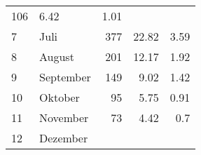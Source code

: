 \begin{longtable}{lXrrr}
       \num{106} &
       \num[round-mode=places,round-precision=2]{6,42} &
         \num[round-mode=places,round-precision=2]{1,01} \\

     7 &
     \multicolumn{1}{X}{ Juli   } &


       \num{377} &
       \num[round-mode=places,round-precision=2]{22,82} &
         \num[round-mode=places,round-precision=2]{3,59} \\

     8 &
     \multicolumn{1}{X}{ August   } &


       \num{201} &
       \num[round-mode=places,round-precision=2]{12,17} &
         \num[round-mode=places,round-precision=2]{1,92} \\

     9 &
     \multicolumn{1}{X}{ September   } &


       \num{149} &
       \num[round-mode=places,round-precision=2]{9,02} &
         \num[round-mode=places,round-precision=2]{1,42} \\

     10 &
     \multicolumn{1}{X}{ Oktober   } &


       \num{95} &
       \num[round-mode=places,round-precision=2]{5,75} &
         \num[round-mode=places,round-precision=2]{0,91} \\

     11 &
     \multicolumn{1}{X}{ November   } &


       \num{73} &
       \num[round-mode=places,round-precision=2]{4,42} &
         \num[round-mode=places,round-precision=2]{0,7} \\

     12 &
     \multicolumn{1}{X}{ Dezember   } &



\end{longtable}
